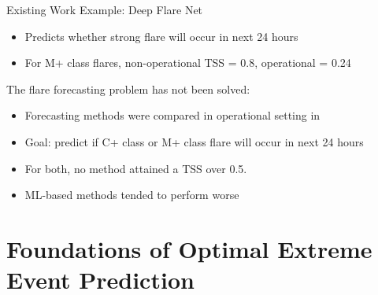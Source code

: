 \documentclass{beamer}
\def\P{\mathbb P}
\def\R{\mathbb R}
\begin{document}
\begin{frame}{Existing Work}
    Example: Deep Flare Net \cite{nishizuka2018deep, nishizuka2021oper}
    \begin{itemize}
        \item Predicts whether strong flare will occur in next 24 hours
        \item For M+ class flares, non-operational TSS = 0.8, operational = 0.24
    \end{itemize}    
    The flare forecasting problem has not been solved:
    \begin{itemize}
        \item Forecasting methods were compared in operational setting in \cite{leka2019acomII, leka2019acomIII}
        \item Goal: predict if C+ class or M+ class flare will occur in next 24 hours
        \item For both, no method attained a TSS over 0.5.
        \item ML-based methods tended to perform worse
    \end{itemize}
\end{frame}

\section{Foundations of Optimal Extreme Event Prediction}

\end{document}

